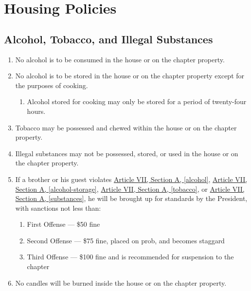 \chapter{Housing Policies}

\section{Alcohol, Tobacco, and Illegal Substances}

	\begin{enumerate}
		\item No alcohol is to be consumed in the house or on the chapter property. \label{alcohol}

		\item No alcohol is to be stored in the house or on the chapter property except for the purposes of cooking. \label{alcohol-storage}
			\begin{enumerate}
				\item Alcohol stored for cooking may only be stored for a period of twenty-four hours.
			\end{enumerate}

		\item Tobacco may be possessed and chewed within the house or on the chapter property. \label{tobacco} 

		\item Illegal substances may not be possessed, stored, or used in the house or on the chapter property. \label{substances}

		\item If a brother or his guest violates \hyperref[alcohol]{Article VII, Section A, \autoref*{alcohol}}, \hyperref[alcohol-storage]{Article VII, Section A, \autoref*{alcohol-storage}}, \hyperref[tobacco]{Article VII, Section A, \autoref*{tobacco}}, or \hyperref[substances]{Article VII, Section A, \autoref*{substances}}, he will be brought up for standards by the President, with sanctions not less than: 
			\begin{enumerate}
				\item First Offense --- \$50 fine
				\item Second Offense --- \$75 fine, placed on \gls{prob}, and becomes \gls{staggard}
				\item Third Offense --- \$100 fine and is recommended for suspension to the chapter
			\end{enumerate} 
		
		\item No candles will be burned inside the house or on the chapter property. 


\end{enumerate}
